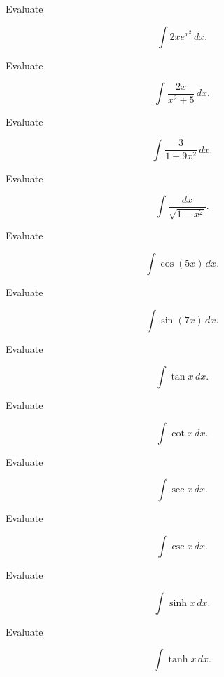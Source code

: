 \begin{exercise}[2]
Evaluate

\[
\int
2x e^{x^2}
\,dx.
\]
\end{exercise}

\begin{exercise}[2]
Evaluate

\[
\int
\frac{
2x
}{
x^2+5
}
\,dx.
\]
\end{exercise}

\begin{exercise}[2]
Evaluate

\[
\int
\frac{
3
}{
1+9x^2
}
\,dx.
\]
\end{exercise}

\begin{exercise}[2]
Evaluate

\[
\int
\frac{
dx
}{
\sqrt{1-x^2}
}.
\]
\end{exercise}

\begin{exercise}[2]
Evaluate

\[
\int
\cos(5x)
\,dx.
\]
\end{exercise}

\begin{exercise}[2]
Evaluate

\[
\int
\sin(7x)
\,dx.
\]
\end{exercise}

\begin{exercise}[2]
Evaluate

\[
\int\tan x\,dx.
\]
\end{exercise}

\begin{exercise}[2]
Evaluate

\[
\int\cot x\,dx.
\]
\end{exercise}

\begin{exercise}[2]
Evaluate

\[
\int\sec x\,dx.
\]
\end{exercise}

\begin{exercise}[2]
Evaluate

\[
\int\csc x\,dx.
\]
\end{exercise}

\begin{exercise}[2]
Evaluate

\[
\int\sinh x\,dx.
\]
\end{exercise}

\begin{exercise}[2]
Evaluate

\[
\int\tanh x\,dx.
\]
\end{exercise}


